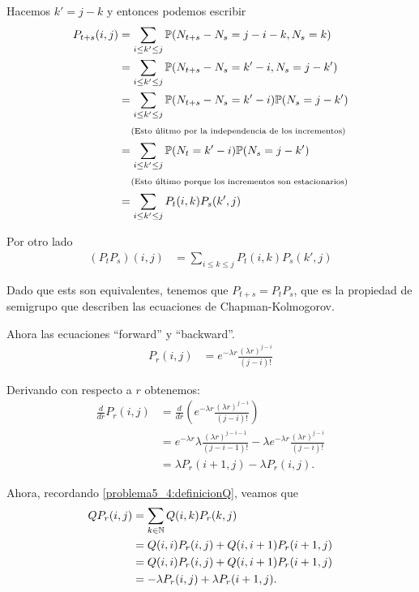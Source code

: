 Hacemos $k' = j - k$ y entonces podemos escribir
\begin{align}
    P_{t+s}(i,j)    &=  \sum_{i \leq k' \leq j}\mathbb{P}(N_{t+s} - N_s = j-i-k, N_s = k)               \\    
                    &=  \sum_{i \leq k' \leq j}\mathbb{P}(N_{t+s} - N_s = k' - i, N_s = j - k')         \\    
                    &=  \sum_{i \leq k' \leq j}\mathbb{P}(N_{t+s} - N_s = k' - i)\mathbb{P}(N_s = j - k')       \\
                    &\;\;\;\;\mbox{{\scriptsize(Esto úlitmo por la independencia de los incrementos)}}              \\
                    &=  \sum_{i \leq k' \leq j}\mathbb{P}(N_{t} = k' - i)\mathbb{P}(N_s = j - k')               \\
                    &\;\;\;\;\mbox{{\scriptsize(Esto último porque los incrementos son estacionarios)}}             \\
                    &=  \sum_{i \leq k' \leq j} P_t(i,k) P_s(k',j)                              \\
\end{align}\pn

Por otro lado
\begin{align}
    (P_t P_s)(i,j)  &=  \sum_{i \leq k \leq j}   P_t(i,k) P_s(k',j)
\end{align}

Dado que ests son equivalentes, tenemos que $P_{t+s} = P_t P_s$, que es la propiedad de semigrupo que describen
las ecuaciones de Chapman-Kolmogorov.\pn

Ahora las ecuaciones ``forward'' y ``backward''.
\begin{align}
    P_r(i, j)   &=  e^{-\lambda r}   \frac{(\lambda r)^{j - i}}{(j - i)!}
\end{align}\pn

Derivando con respecto a $r$ obtenemos:
\begin{align}
    \frac{d}{dr}    P_r(i, j)   &=  \frac{d}{dr} \left( e^{-\lambda r}   \frac{(\lambda r)^{j - i}}{(j - i)!}   \right)                                                         \\
                                &=  e^{-\lambda r} \lambda \frac{(\lambda r)^{j - i - 1}}{(j - i - 1)!} -\lambda e^{-\lambda r}   \frac{(\lambda r)^{j - i}}{(j - i)!}         \\
                                &=  \lambda P_r(i+1, j) - \lambda P_r(i,j).
\end{align}\pn

Ahora, recordando \eqref{problema5_4:definicionQ}, veamos que
\begin{align}
     QP_r(i,j)  &= \sum_{k \in \mathbb{N}} Q(i,k)P_r(k,j)           \\
                &= Q(i,i)P_r(i,j)   + Q(i, i+1)P_r(i+1,j)   \\
                &= Q(i,i)P_r(i,j)   + Q(i, i+1)P_r(i+1,j)   \\
                &=  -\lambda P_r(i,j) + \lambda P_r(i+1,j).
\end{align}\pn

